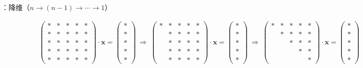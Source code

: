 \entry {}：降维（$n\to (n-1)\to\cdots\to1$）
\begin{figure}[htbp]
\small\centering
\begin{align*}\scriptstyle
\phantom{\displaystyle\ \Rightarrow\ }\begin{pmatrix}
\ast & \ast & \ast & \ast & \ast \\
\ast & \ast & \ast & \ast & \ast \\
\ast & \ast & \ast & \ast & \ast \\
\ast & \ast & \ast & \ast & \ast \\
\ast & \ast & \ast & \ast & \ast
\end{pmatrix}
\cdot \mathbf{\displaystyle x =}
\begin{pmatrix}
\ast \\ \ast \\ \ast \\ \ast \\ \ast
\end{pmatrix}
{\displaystyle\ \Rightarrow\ }
\begin{pmatrix}
\ast & \ast & \ast & \ast & \ast \\
     & \ast & \ast & \ast & \ast \\
     & \ast & \ast & \ast & \ast \\
     & \ast & \ast & \ast & \ast \\
     & \ast & \ast & \ast & \ast
\end{pmatrix}
\cdot \mathbf{\displaystyle x =}
\begin{pmatrix}
\ast \\ \ast \\ \ast \\ \ast \\ \ast
\end{pmatrix}
{\displaystyle\ \Rightarrow\ }
\begin{pmatrix}
\ast & \ast & \ast & \ast & \ast \\
     & \ast & \ast & \ast & \ast \\
     &      & \ast & \ast & \ast \\
     &      &      & \ast & \ast \\
     &      &      &      & \ast
\end{pmatrix}
\cdot \mathbf{\displaystyle x =}
\begin{pmatrix}
\ast \\ \ast \\ \ast \\ \ast \\ \ast

\end{pmatrix}
\end{align*}
\end{figure}
